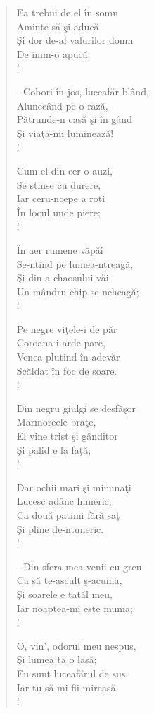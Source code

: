 \documentclass{article}
\begin{document}
\begin{small}
\begin{multicols}{3}
\begin{verse}
Ea trebui de el în somn \\
Aminte să-şi aducă \\
Şi dor de-al valurilor domn \\
De inim-o apucă: \\!

- Cobori în jos, luceafăr blând, \\
Alunecând pe-o rază, \\
Pătrunde-n casă şi în gând \\
Şi viaţa-mi luminează! \\!

Cum el din cer o auzi, \\
Se stinse cu durere, \\
Iar ceru-ncepe a roti \\
În locul unde piere; \\!

În aer rumene văpăi \\
Se-ntind pe lumea-ntreagă, \\
Şi din a chaosului văi \\
Un mândru chip se-ncheagă; \\!

Pe negre viţele-i de păr \\
Coroana-i arde pare, \\
Venea plutind în adevăr \\
Scăldat în foc de soare. \\!

Din negru giulgi se desfăşor \\
Marmoreele braţe, \\
El vine trist şi gânditor \\
Şi palid e la faţă; \\!

Dar ochii mari şi minunaţi \\
Lucesc adânc himeric, \\
Ca două patimi fără saţ \\
Şi pline de-ntuneric. \\!

- Din sfera mea venii cu greu \\
Ca să te-ascult ş-acuma, \\
Şi soarele e tatăl meu, \\
Iar noaptea-mi este muma; \\!

O, vin', odorul meu nespus, \\
Şi lumea ta o lasă; \\
Eu sunt luceafărul de sus, \\
Iar tu să-mi fii mireasă. \\!


\end{verse}
\end{multicols}
\end{small}
\end{document}
